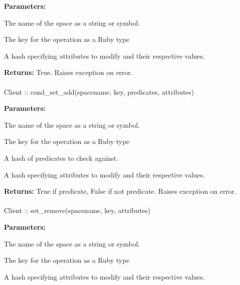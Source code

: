 \noindent\textbf{Parameters:}
\begin{description}[labelindent=\widthof{{\code{attributes}}},leftmargin=*,noitemsep,nolistsep,align=right]
\item[\code{spacename}] The name of the space as a string or symbol.
\item[\code{key}] The key for the operation as a Ruby type
\item[\code{attributes}] A hash specifying attributes to modify and their respective values.
\end{description}

\noindent\textbf{Returns:}
True.  Raises exception on error.

\paragraph{}
\label{api:ruby:cond_set_add}
\begin{rubycode}
Client :: cond_set_add(spacename, key, predicates, attributes)
\end{rubycode}


\noindent\textbf{Parameters:}
\begin{description}[labelindent=\widthof{{\code{predicates}}},leftmargin=*,noitemsep,nolistsep,align=right]
\item[\code{spacename}] The name of the space as a string or symbol.
\item[\code{key}] The key for the operation as a Ruby type
\item[\code{predicates}] A hash of predicates to check against.
\item[\code{attributes}] A hash specifying attributes to modify and their respective values.
\end{description}

\noindent\textbf{Returns:}
True if predicate, False if not predicate.  Raises exception on error.

\paragraph{}
\label{api:ruby:set_remove}
\begin{rubycode}
Client :: set_remove(spacename, key, attributes)
\end{rubycode}


\noindent\textbf{Parameters:}
\begin{description}[labelindent=\widthof{{\code{attributes}}},leftmargin=*,noitemsep,nolistsep,align=right]
\item[\code{spacename}] The name of the space as a string or symbol.
\item[\code{key}] The key for the operation as a Ruby type
\item[\code{attributes}] A hash specifying attributes to modify and their respective values.
\end{description}

